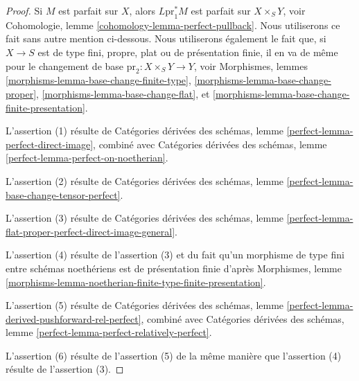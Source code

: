 \begin{proof}
Si $M$ est parfait sur $X$, alors $L\text{pr}_1^*M$
est parfait sur $X \times_S Y$, voir
Cohomologie, lemme \ref{cohomology-lemma-perfect-pullback}.
Nous utiliserons ce fait sans autre mention ci-dessous.
Nous utiliserons également le fait que, si $X \to S$ est de type fini, propre,
plat ou de présentation finie, il en va de même pour
le changement de base $\text{pr}_2 : X \times_S Y \to Y$, voir
Morphismes, lemmes
\ref{morphisms-lemma-base-change-finite-type},
\ref{morphisms-lemma-base-change-proper},
\ref{morphisms-lemma-base-change-flat}, et
\ref{morphisms-lemma-base-change-finite-presentation}.

\medskip\noindent
L'assertion (1) résulte de
Catégories dérivées des schémas, lemme \ref{perfect-lemma-perfect-direct-image},
combiné avec
Catégories dérivées des schémas, lemme \ref{perfect-lemma-perfect-on-noetherian}.

\medskip\noindent
L'assertion (2) résulte de
Catégories dérivées des schémas, lemme
\ref{perfect-lemma-base-change-tensor-perfect}.

\medskip\noindent
L'assertion (3) résulte de
Catégories dérivées des schémas, lemme
\ref{perfect-lemma-flat-proper-perfect-direct-image-general}.

\medskip\noindent
L'assertion (4) résulte de l'assertion (3) et du fait qu'un morphisme de type fini
entre schémas noethériens est de présentation finie d'après Morphismes, lemme
\ref{morphisms-lemma-noetherian-finite-type-finite-presentation}.

\medskip\noindent
L'assertion (5) résulte de
Catégories dérivées des schémas, lemme
\ref{perfect-lemma-derived-pushforward-rel-perfect}, combiné avec
Catégories dérivées des schémas, lemme
\ref{perfect-lemma-perfect-relatively-perfect}.

\medskip\noindent
L'assertion (6) résulte de l'assertion (5) de la même manière que l'assertion (4) résulte de
l'assertion (3).
\end{proof}


